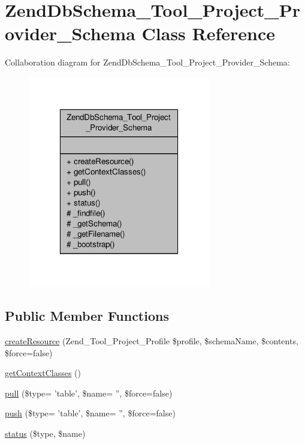 \hypertarget{classZendDbSchema__Tool__Project__Provider__Schema}{\section{Zend\-Db\-Schema\-\_\-\-Tool\-\_\-\-Project\-\_\-\-Provider\-\_\-\-Schema Class Reference}
\label{classZendDbSchema__Tool__Project__Provider__Schema}
}


Collaboration diagram for Zend\-Db\-Schema\-\_\-\-Tool\-\_\-\-Project\-\_\-\-Provider\-\_\-\-Schema\-:\nopagebreak
\begin{figure}[H]
\begin{center}
\leavevmode
\includegraphics[width=226pt]{classZendDbSchema__Tool__Project__Provider__Schema__coll__graph}
\end{center}
\end{figure}
\subsection*{Public Member Functions}
\begin{DoxyCompactItemize}
\item 
\hyperlink{classZendDbSchema__Tool__Project__Provider__Schema_ae23994cc878a689226c458de95a7ecd1}{create\-Resource} (Zend\-\_\-\-Tool\-\_\-\-Project\-\_\-\-Profile \$profile, \$schema\-Name, \$contents, \$force=false)
\item 
\hyperlink{classZendDbSchema__Tool__Project__Provider__Schema_a785beba0921fd9df3111a88499406d64}{get\-Context\-Classes} ()
\item 
\hyperlink{classZendDbSchema__Tool__Project__Provider__Schema_a5f0f3101bb7b9e252f6d6bed1ddadbe5}{pull} (\$type= 'table', \$name= '', \$force=false)
\item 
\hyperlink{classZendDbSchema__Tool__Project__Provider__Schema_aa7746bd0ed044ad415b1b7b884f7a007}{push} (\$type= 'table', \$name= '', \$force=false)
\item 
\hyperlink{classZendDbSchema__Tool__Project__Provider__Schema_a5741419511310dc38038399e9f4ac5e1}{status} (\$type, \$name)
\end{DoxyCompactItemize}
